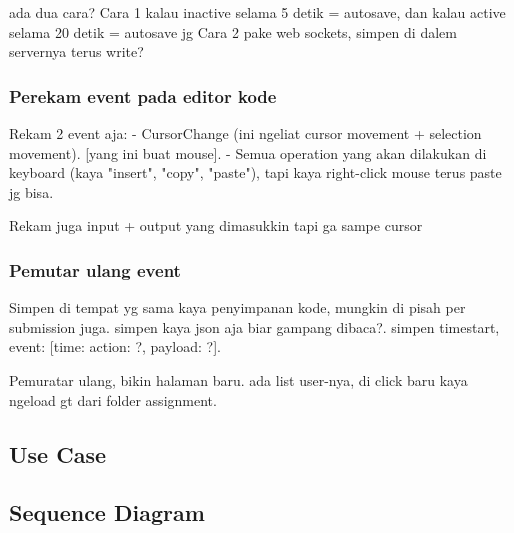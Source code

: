 ada dua cara?
Cara 1 kalau inactive selama 5 detik = autosave, dan kalau active selama 20 detik = autosave jg
Cara 2 pake web sockets, simpen di dalem servernya terus write?

\subsubsection{Perekam event pada editor kode}
\label{sec:3:2:1:rekam}

Rekam 2 event aja:
- CursorChange (ini ngeliat cursor movement + selection movement). [yang ini buat mouse].
- Semua operation yang akan dilakukan di keyboard (kaya "insert", "copy", "paste"), tapi kaya right-click mouse terus paste jg bisa.

Rekam juga input + output yang dimasukkin tapi ga sampe cursor

\subsubsection{Pemutar ulang event}
\label{sec:3:2:1:pemutarulang}

Simpen di tempat yg sama kaya penyimpanan kode, mungkin di pisah per submission juga. simpen kaya json aja biar gampang dibaca?. simpen timestart, event: [time: {action: ?, payload: ?}].

Pemuratar ulang, bikin halaman baru. ada list user-nya, di click baru kaya ngeload gt dari folder assignment.

\subsection{Use Case}
\label{sec:3:2:usecase}

\subsection{Sequence Diagram}
\label{sec:3:2:seqdiagram}